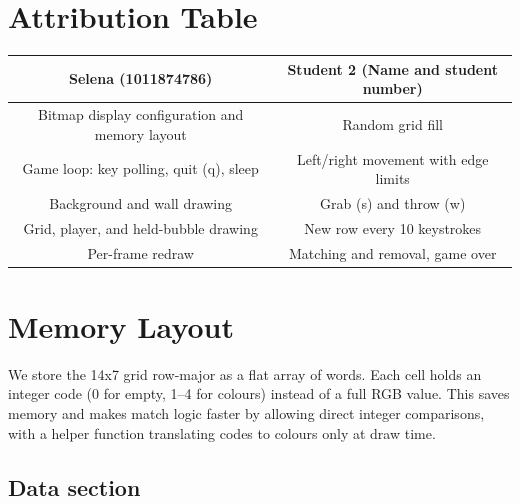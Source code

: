 \documentclass{article}
\begin{document}
\section{Attribution Table}

\begin{center}
\begin{tabular}{|| c | c ||}
\hline
 Selena (1011874786) &  Student 2 (Name and student number) \\ 
 \hline
 Bitmap display configuration and memory layout & Random grid fill\\
 \hline
 Game loop: key polling, quit (q), sleep & Left/right movement with edge limits\\
 \hline
 Background and wall drawing & Grab (s) and throw (w)\\ 
 \hline
 Grid, player, and held-bubble drawing & New row every 10 keystrokes\\ 
 \hline
 Per-frame redraw & Matching and removal, game over\\
 \hline
\end{tabular}
\end{center}



\section{Memory Layout}

We store the 14x7 grid row-major as a flat array of words. Each cell holds an integer code (0 for empty, 1–4 for colours) instead of a full RGB value. This saves memory and makes match logic faster by allowing direct integer comparisons, with a helper function translating codes to colours only at draw time.

\subsection{Data section}
\end{document}
